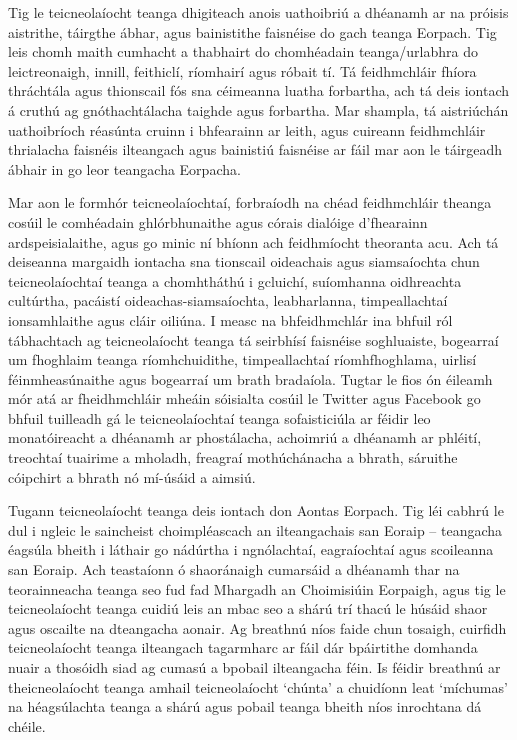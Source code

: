 \begin{multicols}{2}
Tig le teicneolaíocht teanga dhigiteach anois uathoibriú a dhéanamh ar na próisis aistrithe, táirgthe ábhar, agus bainistithe faisnéise do gach teanga Eorpach. Tig leis chomh maith cumhacht a thabhairt do chomhéadain teanga/urlabhra do leictreonaigh, innill, feithiclí, ríomhairí agus róbait tí. Tá feidhmchláir fhíora thráchtála agus thionscail fós sna céimeanna luatha forbartha, ach tá deis iontach á cruthú ag gnóthachtálacha taighde agus forbartha. Mar shampla, tá aistriúchán uathoibríoch réasúnta cruinn i bhfearainn ar leith, agus cuireann feidhmchláir thrialacha faisnéis ilteangach agus bainistiú faisnéise ar fáil mar aon le táirgeadh ábhair in go leor teangacha Eorpacha. 

Mar aon le formhór teicneolaíochtaí, forbraíodh na chéad feidhmchláir theanga cosúil le comhéadain ghlórbhunaithe agus córais dialóige d’fhearainn ardspeisialaithe, agus go minic ní bhíonn ach feidhmíocht theoranta acu. Ach tá deiseanna margaidh iontacha sna tionscail oideachais agus siamsaíochta chun teicneolaíochtaí teanga a chomhtháthú i gcluichí, suíomhanna oidhreachta cultúrtha, pacáistí oideachas-siamsaíochta, leabharlanna, timpeallachtaí ionsamhlaithe agus cláir oiliúna. I measc na bhfeidhmchlár ina bhfuil ról tábhachtach ag teicneolaíocht teanga tá seirbhísí faisnéise soghluaiste, bogearraí um fhoghlaim teanga ríomhchuidithe, timpeallachtaí ríomhfhoghlama, uirlisí féinmheasúnaithe agus bogearraí um brath bradaíola. Tugtar le fios ón éileamh mór atá ar fheidhmchláir mheáin sóisialta cosúil le Twitter agus Facebook go bhfuil tuilleadh gá le teicneolaíochtaí teanga sofaisticiúla ar féidir leo monatóireacht a dhéanamh ar phostálacha, achoimriú a dhéanamh ar phléití, treochtaí tuairime a mholadh, freagraí mothúchánacha a bhrath, sáruithe cóipchirt a bhrath nó mí-úsáid a aimsiú.

Tugann teicneolaíocht teanga deis iontach don Aontas Eorpach. Tig léi cabhrú le dul i ngleic le saincheist choimpléascach an ilteangachais san Eoraip – teangacha éagsúla bheith i láthair go nádúrtha i ngnólachtaí, eagraíochtaí agus scoileanna san Eoraip. Ach teastaíonn ó shaoránaigh cumarsáid a dhéanamh thar na teorainneacha teanga seo fud fad Mhargadh an Choimisiúin Eorpaigh, agus tig le teicneolaíocht teanga cuidiú leis an mbac seo a shárú trí thacú le húsáid shaor agus oscailte na dteangacha aonair. Ag breathnú níos faide chun tosaigh, cuirfidh teicneolaíocht teanga ilteangach tagarmharc ar fáil dár bpáirtithe domhanda nuair a thosóidh siad ag cumasú a bpobail ilteangacha féin. Is féidir breathnú ar theicneolaíocht teanga amhail teicneolaíocht ‘chúnta’ a chuidíonn leat `míchumas’ na héagsúlachta teanga a shárú agus pobail teanga bheith níos inrochtana dá chéile.


\end{multicols}
